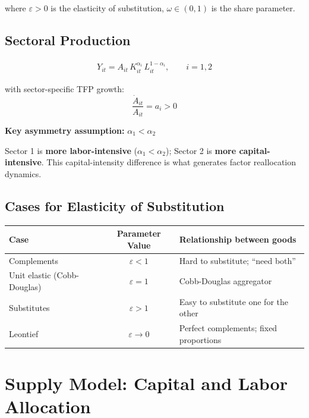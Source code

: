 \documentclass[a4paper,11pt]{article}
\begin{document}
where $\varepsilon > 0$ is the elasticity of substitution, $\omega \in (0,1)$ is the share parameter.

\subsection*{Sectoral Production}

\begin{align*}
Y_{it} = A_{it}\, K_{it}^{\alpha_i}\, L_{it}^{1-\alpha_i}, \qquad i = 1, 2
\tag{Sector Production}
\end{align*}

with sector-specific TFP growth:
\[
\frac{\dot{A}_{it}}{A_{it}} = a_i > 0
\]

\textbf{Key asymmetry assumption:} $\alpha_1 < \alpha_2$

\begin{tcolorbox}[colback=orange!10,colframe=orange3,title=Sector Asymmetry]
Sector 1 is \textbf{more labor-intensive} ($\alpha_1 < \alpha_2$); Sector 2 is \textbf{more capital-intensive}.
This capital-intensity difference is what generates factor reallocation dynamics.
\end{tcolorbox}

\subsection*{Cases for Elasticity of Substitution}

\begin{center}
\begin{tabular}{lcl}
\toprule
\textbf{Case} & \textbf{Parameter Value} & \textbf{Relationship between goods} \\
\midrule
Complements & $\varepsilon < 1$ & Hard to substitute; ``need both'' \\
Unit elastic (Cobb-Douglas) & $\varepsilon = 1$ & Cobb-Douglas aggregator \\
Substitutes & $\varepsilon > 1$ & Easy to substitute one for the other \\
Leontief & $\varepsilon \to 0$ & Perfect complements; fixed proportions \\
\bottomrule
\end{tabular}
\end{center}

\clearpage

\section{Supply Model: Capital and Labor Allocation}
\end{document}
